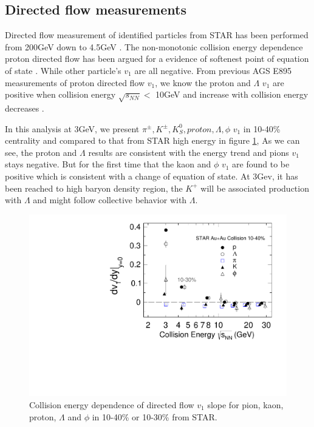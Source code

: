 \clearpage
\newpage
\subsection{Directed flow measurements}

Directed flow measurement of identified particles from STAR has been performed from 200GeV down to 4.5GeV \cite{Adamczyk:2014ipa, Adamczyk:2017nxg, Adam:2020pla}. The non-monotonic collision energy dependence proton  directed flow has been argued for a evidence of softenest point of equation of state \cite{Hung:1994eq, Konchakovski:2014gda, Nara:2016phs}. While other particle's $v_{1}$ are all negative. From previous AGS E895 measurements of proton directed flow $v_{1}$, we know the proton and $\Lambda$ $v_{1}$ are positive when collision energy $\sqrt{s_{NN}} <$ 10GeV and increase with collision energy decreases \cite{Liu:2000am}.  

In this analysis at 3GeV, we present $\pi^{\pm}, K^{\pm}, K^{0}_{S}, proton, \Lambda, \phi$ $v_{1}$ in 10-40\% centrality and compared to that from STAR high energy
 in figure \ref{fig:v1_energy}, As we can see, the proton and $\Lambda$ results are consistent with the energy trend and pions $v_{1}$ stays negative. But for the first time that the kaon and $\phi$ $v_{1}$ are found to be positive which is consistent with a change of equation of state. At 3Gev, it has been reached to high baryon density region, the $K^{+}$ will be associated production with $\Lambda$ and might follow collective behavior with $\Lambda$.


\begin{figure}
    \centering
    \includegraphics[scale=0.5]{FXT3gev/chapter4/fig/v1_energy.pdf}
    \caption{Collision energy dependence of directed flow $v_{1}$ slope for pion, kaon, proton, $\Lambda$ and $\phi$ in 10-40\% or 10-30\% from STAR.} 
    \label{fig:v1_energy}
\end{figure}



















